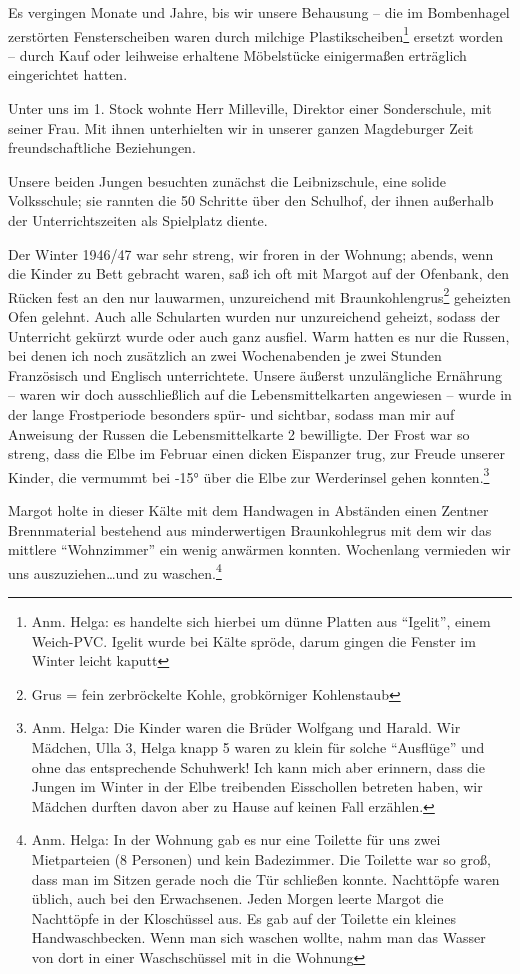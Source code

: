 Es vergingen Monate und Jahre, bis wir unsere Behausung -- die im Bombenhagel zerstörten Fensterscheiben waren durch milchige Plastikscheiben\footnote{Anm. Helga: es handelte sich hierbei um dünne Platten aus \enquote{Igelit}, einem Weich-PVC. Igelit wurde bei Kälte spröde, darum gingen die Fenster im Winter leicht kaputt} ersetzt worden -- durch Kauf oder leihweise erhaltene Möbelstücke einigermaßen erträglich eingerichtet hatten.

Unter uns im 1. Stock wohnte Herr Milleville, Direktor einer Sonderschule, mit seiner Frau. Mit ihnen unterhielten wir in unserer ganzen Magdeburger Zeit freundschaftliche Beziehungen.

Unsere beiden Jungen besuchten zunächst die Leibnizschule, eine solide Volksschule; sie rannten die 50 Schritte über den Schulhof, der ihnen außerhalb der Unterrichtszeiten als Spielplatz diente.

Der Winter 1946/47 war sehr streng, wir froren in der Wohnung; abends, wenn die Kinder zu Bett gebracht waren, saß ich oft mit Margot auf der Ofenbank, den Rücken fest an den nur lauwarmen, unzureichend mit Braunkohlengrus\footnote{Grus = fein zerbröckelte Kohle, grobkörniger Kohlenstaub} geheizten Ofen gelehnt. Auch alle Schularten wurden nur unzureichend geheizt, sodass der Unterricht gekürzt wurde oder auch ganz ausfiel. Warm hatten es  nur die Russen, bei denen ich noch zusätzlich an zwei Wochenabenden je zwei Stunden Französisch und Englisch unterrichtete. Unsere äußerst unzulängliche Ernährung -- waren wir doch ausschließlich auf die Lebensmittelkarten angewiesen -- wurde in der lange Frostperiode besonders spür- und sichtbar, sodass man mir auf Anweisung der Russen die Lebensmittelkarte 2 bewilligte. Der Frost war so streng, dass die Elbe im Februar einen dicken Eispanzer trug, zur Freude unserer Kinder, die vermummt bei -15° über die Elbe zur Werderinsel gehen konnten.\footnote{Anm. Helga: Die Kinder waren die Brüder Wolfgang und Harald. Wir Mädchen, Ulla 3, Helga knapp 5 waren zu klein für solche \enquote{Ausflüge} und ohne das entsprechende Schuhwerk! Ich kann mich aber erinnern, dass die Jungen im Winter in der Elbe treibenden Eisschollen betreten haben, wir Mädchen durften davon aber zu Hause auf keinen Fall erzählen.}

Margot holte in dieser Kälte mit dem Handwagen in Abständen einen Zentner Brennmaterial bestehend aus minderwertigen Braunkohlegrus mit dem wir das mittlere \enquote{Wohnzimmer} ein wenig anwärmen konnten. Wochenlang vermieden wir uns auszuziehen\dots und zu waschen.\footnote{Anm. Helga: In der Wohnung gab es nur eine Toilette für uns zwei Mietparteien (8 Personen) und kein Badezimmer. Die Toilette war so groß, dass man im Sitzen gerade noch die Tür schließen konnte. Nachttöpfe waren üblich, auch bei den Erwachsenen. Jeden Morgen leerte Margot die Nachttöpfe in der Kloschüssel aus. Es gab auf der Toilette ein kleines Handwaschbecken. Wenn man sich waschen wollte, nahm man das Wasser von dort in einer Waschschüssel mit in die Wohnung}

